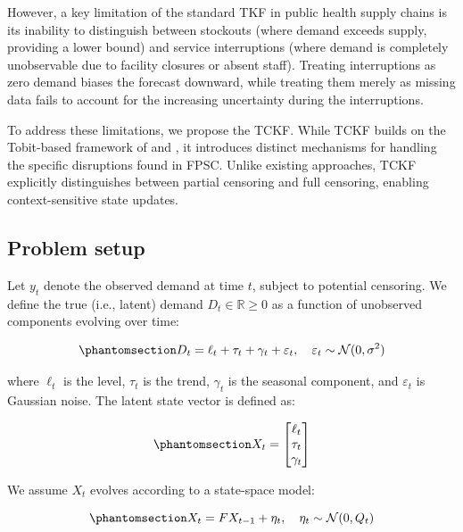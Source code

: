 \documentclass[
  11pt,
  authoryear,
  doubleblind,
  3p]{elsarticle}
\begin{document}
However, a key limitation of the standard TKF in public health supply
chains is its inability to distinguish between stockouts (where demand
exceeds supply, providing a lower bound) and service interruptions
(where demand is completely unobservable due to facility closures or
absent staff). Treating interruptions as zero demand biases the forecast
downward, while treating them merely as missing data fails to account
for the increasing uncertainty during the interruptions.

To address these limitations, we propose the TCKF. While TCKF builds on
the Tobit-based framework of \citet{trapero2024} and \citet{pedregal},
it introduces distinct mechanisms for handling the specific disruptions
found in FPSC. Unlike existing approaches, TCKF explicitly distinguishes
between partial censoring and full censoring, enabling context-sensitive
state updates.

\subsection{Problem setup}\label{problem-setup}

Let \(y_t\) denote the observed demand at time \(t\), subject to
potential censoring. We define the true (i.e., latent) demand
\(D_t \in \mathbb{R}{\geq 0}\) as a function of unobserved components
evolving over time:

\begin{equation}\phantomsection\label{eq-one}{
D_t = \ell_t + \tau_t + \gamma_t + \varepsilon_t, \quad \varepsilon_t \sim \mathcal{N}(0, \sigma^2)
}\end{equation}

where \(\ell_t\) is the level, \(\tau_t\) is the trend, \(\gamma_t\) is
the seasonal component, and \(\varepsilon_t\) is Gaussian noise. The
latent state vector is defined as:

\begin{equation}\phantomsection\label{eq-two}{
X_t = \begin{bmatrix} \ell_t \\ \tau_t \\ \gamma_t \end{bmatrix}
}\end{equation}

We assume \(X_t\) evolves according to a state-space model:

\begin{equation}\phantomsection\label{eq-three}{
X_t = F X_{t-1} + \eta_t, \quad \eta_t \sim \mathcal{N}(0, Q_t)
}\end{equation}
\end{document}
